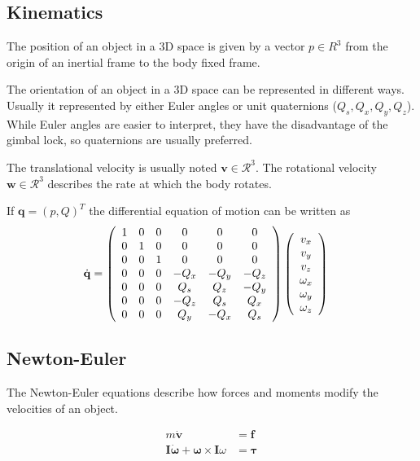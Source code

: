 \subsection{Kinematics}
The position of an object in a 3D space is given by a vector $p \in R^3$ from the origin of an inertial frame to the body fixed frame.

The orientation of an object in a 3D space can be represented in different ways. Usually it represented by either Euler angles or unit quaternions ($Q_s, Q_x, Q_y, Q_z$). While Euler angles are easier to interpret, they have the disadvantage of the gimbal lock, so quaternions are usually preferred.

The translational velocity is usually noted $\mathbf{v} \in \mathcal{R}^3$. The rotational velocity $\mathbf{w} \in \mathcal{R}^3$ describes the rate at which the body rotates.

If $\mathbf{q} = (p, Q)^T$ the differential equation of motion can be written as 
\begin{align*}
\dot{\mathbf{q}} &= \left(\begin{array}{c c c c c c}
1 & 0 & 0 & 0 & 0 & 0\\
0 & 1 & 0 & 0 & 0 & 0\\
0 & 0 & 1 & 0 & 0 & 0\\
0 & 0 & 0 & -Q_x & -Q_y & -Q_z\\
0 & 0 & 0 & Q_s & Q_z & -Q_y\\
0 & 0 & 0 & -Q_z & Q_s & Q_x\\
0 & 0 & 0 & Q_y & -Q_x & Q_s
\end{array}\right)
\left(\begin{array}{c}
v_x\\
v_y\\
v_z\\
\omega_x\\
\omega_y\\
\omega_z
\end{array}\right)
\end{align*}

\subsection{Newton-Euler}
The Newton-Euler equations describe how forces and moments modify the velocities of an object.

\begin{align}
m\dot{\mathbf{v}} &= \mathbf{f} \label{eq:newton1}\\
\mathbf{I}\dot{\mathbf{\omega}} + \mathbf{\omega} \times \mathbf{I}\omega &= \mathbf{\tau}
\end{align}

